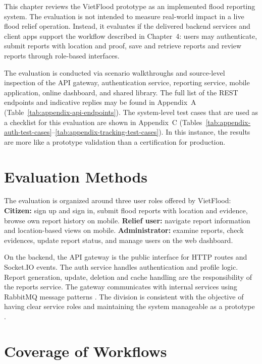 This chapter reviews the VietFlood prototype as an implemented flood reporting system. The evaluation is not intended to measure real-world impact in a live flood relief operation. Instead, it evaluates if the delivered backend services and client apps support the workflow described in Chapter~4: users may authenticate, submit reports with location and proof, save and retrieve reports and review reports through role-based interfaces.

The evaluation is conducted via scenario walkthroughs and source-level inspection of the API gateway, authentication service, reporting service, mobile application, online dashboard, and shared library. The full list of the REST endpoints and indicative replies may be found in Appendix~A (Table~\ref{tab:appendix-api-endpoints}). The system-level test cases that are used as a checklist for this evaluation are shown in Appendix~C (Tables~\ref{tab:appendix-auth-test-cases}--\ref{tab:appendix-tracking-test-cases}). In this instance, the results are more like a prototype validation than a certification for production.

\section{Evaluation Methods}

The evaluation is organized around three user roles offered by VietFlood:
\textbf{Citizen:} sign up and sign in, submit flood reports with location and evidence, browse own report history on mobile. \textbf{Relief user:} navigate report information and location-based views on mobile. \textbf{Administrator:} examine reports, check evidences, update report status, and manage users on the web dashboard.

On the backend, the API gateway is the public interface for HTTP routes and Socket.IO events\cite{socketioDocs}. The auth service handles authentication and profile logic. Report generation, update, deletion and cache handling are the responsibility of the reports service. The gateway communicates with internal services using RabbitMQ message patterns \cite{rabbitmqConfirmsDocs}. The division is consistent with the objective of having clear service roles and maintaining the system manageable as a prototype \cite{bass2021softwareArchitecture}.

\section{Coverage of Workflows}

